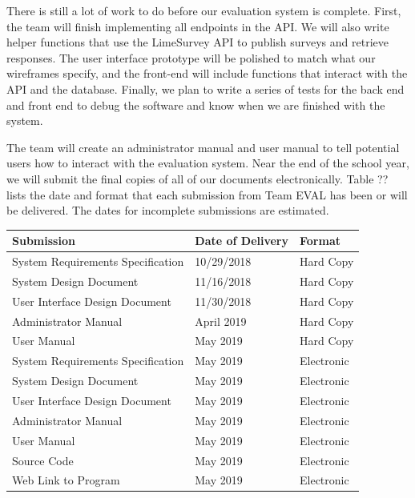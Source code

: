 \documentclass{article}
\begin{document}
There is still a lot of work to do before our evaluation system is complete. First, the team will finish implementing all endpoints in the API. We will also write helper functions that use the LimeSurvey API to publish surveys and retrieve responses. The user interface prototype will be polished to match what our wireframes specify, and the front-end will include functions that interact with the API and the database. Finally, we plan to write a series of tests for the back end and front end to debug the software and know when we are finished with the system.

The team will create an administrator manual and user manual to tell potential users how to interact with the evaluation system. Near the end of the school year, we will submit the final copies of all of our documents electronically. Table ?? lists the date and format that each submission from Team EVAL has been or will be delivered. The dates for incomplete submissions are estimated.

\begin{center}
\begin{tabular}{|p{6cm}|p{3cm}|p{3cm}|} 
\hline
\textbf{Submission} & \textbf{Date of Delivery} & \textbf{Format} \\
\hline
System Requirements Specification & 10/29/2018 & Hard Copy\\ 
\hline
System Design Document & 11/16/2018 & Hard Copy\\ 
\hline
User Interface Design Document & 11/30/2018 & Hard Copy\\ 
\hline
Administrator Manual & April 2019 & Hard Copy\\ 
\hline
User Manual & May 2019 & Hard Copy\\ 
\hline
System Requirements Specification & May 2019 & Electronic\\ 
\hline
System Design Document & May 2019 & Electronic\\ 
\hline
User Interface Design Document & May 2019 & Electronic\\ 
\hline
Administrator Manual & May 2019 & Electronic\\ 
\hline
User Manual & May 2019 & Electronic\\ 
\hline
Source Code & May 2019 & Electronic\\ 
\hline
Web Link to Program & May 2019 & Electronic\\ 
\hline
\end{tabular}
\end{center}
\end{document}
